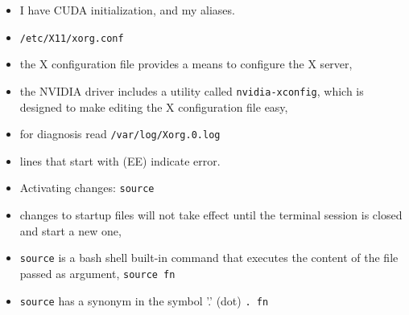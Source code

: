 \documentclass[twocolumn]{IEEEtran} %
\begin{document}
\begin{itemize}
        \item I have CUDA initialization, and my aliases.
    \ei
    \item \verb|/etc/X11/xorg.conf|
    \bi
        \item the X configuration file provides a means to configure the X server,
        \item the NVIDIA driver includes a utility called \verb|nvidia-xconfig|, which is designed to make editing the X configuration file easy,
        \item for diagnosis read \verb|/var/log/Xorg.0.log|
        \bi
            \item lines that start with (EE) indicate error.
        \ei
    \ei
    \item Activating changes: \verb|source|
    \bi
        \item changes to startup files will not take effect until the terminal session is closed and start a new one,
        \item \verb|source| is a bash shell built-in command that executes the content of the file passed as argument,
        \verb|source fn|
        \item \verb|source| has a synonym in the symbol '.' (dot) \newline
        \verb|. fn|
    \ei
\end{itemize}


\newpage
\end{document}

